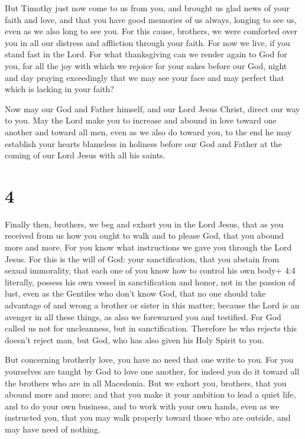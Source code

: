  But Timothy just now come to us from you, and brought us
glad news of your faith and love, and that you have good memories of us
always, longing to see us, even as we also long to see you. 
For this cause, brothers, we were comforted over you in all our distress
and affliction through your faith.  For now we live, if you
stand fast in the Lord.  For what thanksgiving can we render
again to God for you, for all the joy with which we rejoice for your
sakes before our God,  night and day praying exceedingly
that we may see your face and may perfect that which is lacking in your
faith?

 Now may our God and Father himself, and our Lord Jesus
Christ, direct our way to you.  May the Lord make you to
increase and abound in love toward one another and toward all men, even
as we also do toward you,  to the end he may establish your
hearts blameless in holiness before our God and Father at the coming of
our Lord Jesus with all his saints.

\hypertarget{section-3}{%
\section{4}\label{section-3}}

 Finally then, brothers, we beg and exhort you in the Lord
Jesus, that as you received from us how you ought to walk and to please
God, that you abound more and more.  For you know what
instructions we gave you through the Lord Jesus.  For this
is the will of God: your sanctification, that you abstain from sexual
immorality,  that each one of you know how to control his
own body+ 4:4 literally, possess his own vessel in sanctification and
honor,  not in the passion of lust, even as the Gentiles who
don't know God,  that no one should take advantage of and
wrong a brother or sister in this matter; because the Lord is an avenger
in all these things, as also we forewarned you and testified.
 For God called us not for uncleanness, but in
sanctification.  Therefore he who rejects this doesn't
reject man, but God, who has also given his Holy Spirit to you.

 But concerning brotherly love, you have no need that one
write to you. For you yourselves are taught by God to love one another,
 for indeed you do it toward all the brothers who are in
all Macedonia. But we exhort you, brothers, that you abound more and
more;  and that you make it your ambition to lead a quiet
life, and to do your own business, and to work with your own hands, even
as we instructed you,  that you may walk properly toward
those who are outside, and may have need of nothing.

